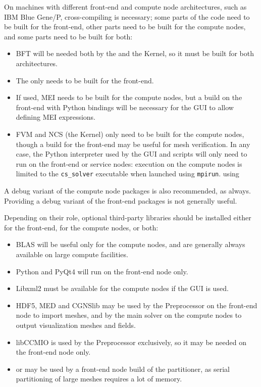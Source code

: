 \documentclass[a4paper,10pt,twoside]{article}
\begin{document}
On machines with different front-end and compute node architectures,
such as IBM Blue Gene/P, cross-compiling is necessary;
some parts of the code need to be built for the front-end, other parts need
to be built for the compute nodes, and some parts need to be built for both:

\begin{itemize}
\item BFT will be needed both by the \pcs and the Kernel, so it must
      be built for both architectures.
\item The \pcs only needs to be built for the front-end.
\item If used, MEI needs to be built for the compute nodes,
      but a build on the front-end with Python bindings will be necessary
      for the GUI to allow defining MEI expressions.
\item FVM and NCS (the Kernel) only need to be built for the compute nodes,
      though a build for the front-end may be useful for mesh verification.
      In any case, the Python interpreter used by the GUI and scripts
      will only need to run on the front-end or service nodes:
      execution on the compute nodes is limited to the \texttt{cs\_solver}
      executable when launched using \texttt{mpirun}.
      using 
\end{itemize}

A debug variant of the compute node packages is also recommended, as always.
Providing a debug variant of the front-end packages is not generally useful.

Depending on their role, optional third-party libraries should be installed
either for the front-end, for the compute nodes, or both:

\begin{itemize}
\item BLAS will be useful only for the compute nodes, and are generally
      always available on large compute facilities.
\item Python and PyQt4 will run on the front-end node only.
\item Libxml2 must be available for the compute nodes if the GUI is used.
\item HDF5, MED and CGNSlib may be used by the Preprocessor on the front-end node
      to import meshes, and by the main solver on the compute nodes
      to output visualization meshes and fields.
\item libCCMIO is used by the Preprocessor exclusively, so it may be needed on the
      front-end node only.
\item \scotch or \metis may be used by a front-end node build of the
      partitioner, as serial partitioning of large meshes requires a lot of memory.
\end{itemize}
\end{document}
